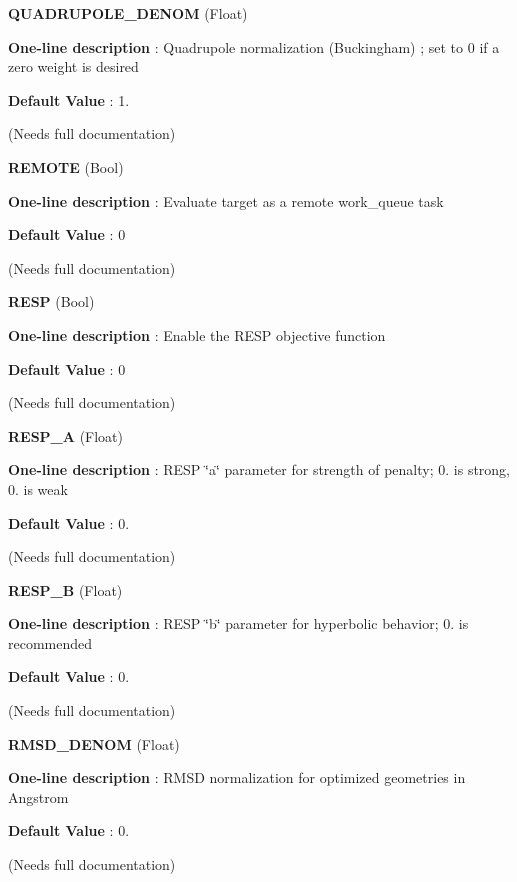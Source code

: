 \begin{DoxyItemize}
\item {\bfseries  Q\-U\-A\-D\-R\-U\-P\-O\-L\-E\-\_\-\-D\-E\-N\-O\-M } (Float) \par
{\bfseries  One-\/line description }\-: Quadrupole normalization (Buckingham) ; set to 0 if a zero weight is desired \par
{\bfseries  Default Value }\-: 1. \par
(Needs full documentation)\end{DoxyItemize}
\begin{DoxyItemize}
\item {\bfseries  R\-E\-M\-O\-T\-E } (Bool) \par
{\bfseries  One-\/line description }\-: Evaluate target as a remote work\-\_\-queue task \par
{\bfseries  Default Value }\-: 0 \par
(Needs full documentation)\end{DoxyItemize}
\begin{DoxyItemize}
\item {\bfseries  R\-E\-S\-P } (Bool) \par
{\bfseries  One-\/line description }\-: Enable the R\-E\-S\-P objective function \par
{\bfseries  Default Value }\-: 0 \par
(Needs full documentation)\end{DoxyItemize}
\begin{DoxyItemize}
\item {\bfseries  R\-E\-S\-P\-\_\-\-A } (Float) \par
{\bfseries  One-\/line description }\-: R\-E\-S\-P \char`\"{}a\char`\"{} parameter for strength of penalty; 0. is strong, 0. is weak \par
{\bfseries  Default Value }\-: 0. \par
(Needs full documentation)\end{DoxyItemize}
\begin{DoxyItemize}
\item {\bfseries  R\-E\-S\-P\-\_\-\-B } (Float) \par
{\bfseries  One-\/line description }\-: R\-E\-S\-P \char`\"{}b\char`\"{} parameter for hyperbolic behavior; 0. is recommended \par
{\bfseries  Default Value }\-: 0. \par
(Needs full documentation)\end{DoxyItemize}
\begin{DoxyItemize}
\item {\bfseries  R\-M\-S\-D\-\_\-\-D\-E\-N\-O\-M } (Float) \par
{\bfseries  One-\/line description }\-: R\-M\-S\-D normalization for optimized geometries in Angstrom \par
{\bfseries  Default Value }\-: 0. \par
(Needs full documentation)\end{DoxyItemize}
